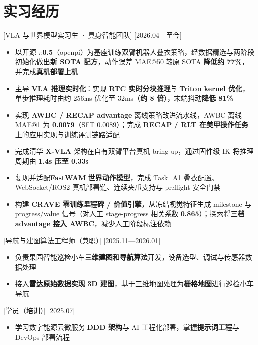\documentclass{resume-photo}
\newcommand{\hl}[1]{\textbf{\textcolor{hlred}{#1}}}
\begin{document}
\section{实习经历}

[\textnormal{VLA 与世界模型实习生 · 具身智能团队}]
[2026.04—至今]

\begin{itemize}
  \item 以开源 \hl{\(\pi\)0.5}（openpi）为基座训练双臂机器人叠衣策略，经数据精选与两阶段初始化做出\hl{新 SOTA 配方}，动作误差 MAE@50 较原 SOTA \hl{降低约 77\%}，并完成\hl{真机部署上机}
  \item 主导 \hl{VLA 推理实时化}：实现 \hl{RTC 实时分块推理}与 \hl{Triton kernel 优化}，单步推理耗时由约 256ms 优化至 32ms（\hl{约 8 倍}），末端抖动\hl{降低 81\%}
  \item 实现 \hl{AWBC / RECAP advantage} 离线策略改进流水线，AWBC 离线 MAE@1 为 \hl{0.0079}（SFT 0.0089）；完成 \hl{RECAP / RLT 在美甲操作任务}上的应用实现与训练评测链路适配
  \item 完成清华 \hl{X-VLA} 架构在自有双臂平台真机 bring-up，通过固件级 IK 将推理周期由 \hl{1.4s 压至 0.33s}
  \item 复现并适配\hl{FastWAM 世界动作模型}，完成 Task\_A1 叠衣配置、WebSocket/ROS2 真机部署链、连续夹爪支持与 preflight 安全门禁
  \item 构建 \hl{CRAVE 零训练里程碑 / 价值引擎}，从冻结视觉特征生成 milestone 与 progress/value 信号（对人工 stage-progress 相关系数 \hl{0.865}）；探索将\hl{三档 advantage 接入 AWBC}，减少人工阶段标注依赖
\end{itemize}

[\textnormal{导航与建图算法工程师（兼职）}]
[2025.11—2026.01]

\begin{itemize}
  \item 负责果园智能巡检小车\hl{三维建图和导航算法}开发，设备选型、调试与传感器数据处理
  \item 接入\hl{雷达原始数据实现 3D 建图}，基于三维地图处理为\hl{栅格地图}进行巡检小车导航
\end{itemize}

[\textnormal{学员（培训）}]
[2025.07]

\begin{itemize}
  \item 学习数字能源云微服务 \hl{DDD 架构}与 AI 工程化部署，掌握\hl{提示词工程}与 DevOps 部署流程
\end{itemize}
\end{document}
